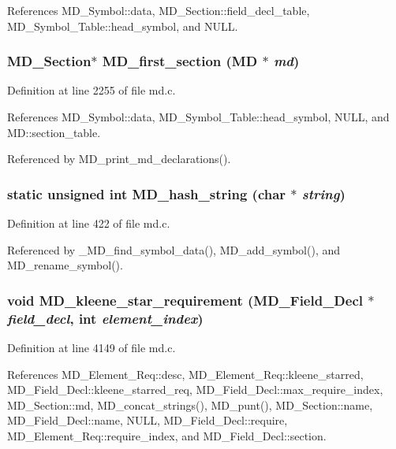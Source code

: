 References MD\_\-Symbol::data, MD\_\-Section::field\_\-decl\_\-table, MD\_\-Symbol\_\-Table::head\_\-symbol, and NULL.
\subsubsection{\setlength{\rightskip}{0pt plus 5cm}\bf{MD\_\-Section}$\ast$ MD\_\-first\_\-section (\bf{MD} $\ast$ {\em md})}\label{md_8c_80898363bd87b2073facc7280db90304}




Definition at line 2255 of file md.c.

References MD\_\-Symbol::data, MD\_\-Symbol\_\-Table::head\_\-symbol, NULL, and MD::section\_\-table.

Referenced by MD\_\-print\_\-md\_\-declarations().
\subsubsection{\setlength{\rightskip}{0pt plus 5cm}static unsigned int MD\_\-hash\_\-string (char $\ast$ {\em string})\hspace{0.3cm}{\tt  [static]}}\label{md_8c_444656c362b5d08e2827159173727029}




Definition at line 422 of file md.c.

Referenced by \_\-MD\_\-find\_\-symbol\_\-data(), MD\_\-add\_\-symbol(), and MD\_\-rename\_\-symbol().
\subsubsection{\setlength{\rightskip}{0pt plus 5cm}void MD\_\-kleene\_\-star\_\-requirement (\bf{MD\_\-Field\_\-Decl} $\ast$ {\em field\_\-decl}, int {\em element\_\-index})}\label{md_8c_b337c713035473e4b06c4125538f2a99}




Definition at line 4149 of file md.c.

References MD\_\-Element\_\-Req::desc, MD\_\-Element\_\-Req::kleene\_\-starred, MD\_\-Field\_\-Decl::kleene\_\-starred\_\-req, MD\_\-Field\_\-Decl::max\_\-require\_\-index, MD\_\-Section::md, MD\_\-concat\_\-strings(), MD\_\-punt(), MD\_\-Section::name, MD\_\-Field\_\-Decl::name, NULL, MD\_\-Field\_\-Decl::require, MD\_\-Element\_\-Req::require\_\-index, and MD\_\-Field\_\-Decl::section.

